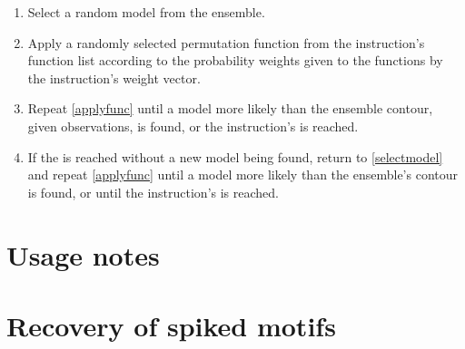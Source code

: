 \begin{enumerate}
    \item\label{selectmodel} Select a random  model from the ensemble.
    \item\label{applyfunc} Apply a randomly selected permutation function from the instruction's function list according to the probability weights given to the functions by the instruction's weight vector.
    \item Repeat \ref{applyfunc} until a model more likely than the ensemble contour, given observations, is found, or the instruction's  is reached.
    \item If the  is reached without a new model being found, return to \ref{selectmodel} and repeat \ref{applyfunc} until a model more likely than the ensemble's contour is found, or until the instruction's  is reached.
\end{enumerate}

\section{Usage notes}

\section{Recovery of spiked motifs}